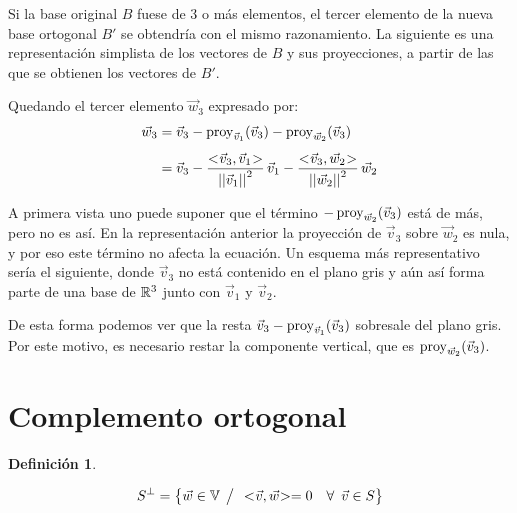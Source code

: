 \documentclass[a5paper,12pt,twoside]{book}
\newtheorem{defn}{{Definición}}[chapter]
\begin{document}
Si la base original $B$ fuese de 3 o más elementos, el tercer elemento de la nueva base ortogonal $B'$ se obtendría con el mismo razonamiento. La siguiente es una representación simplista de los vectores de $B$ y sus proyecciones, a partir de las que se obtienen los vectores de $B'$.

\begin{center}
    \def\svgwidth{0.6\linewidth}
    
\end{center}

Quedando el tercer elemento $\Vec{w}_3$ expresado por:
\begin{align*}
    \Vec{w}_3 &= \Vec{v}_3 - \operatorname{proy}_{\Vec{v}_1}(\Vec{v}_3) - \operatorname{proy}_{\Vec{w}_2}(\Vec{v}_3)
    \\[1ex]
    &= \Vec{v}_3 - \frac{<\hspace{-0.8mm}\Vec{v}_3,\Vec{v}_1\hspace{-0.8mm}>}{{\left|\left| {\Vec{v}_1} \right|\right|}^2} \, \Vec{v}_1 - \frac{<\hspace{-0.8mm}\Vec{v}_3,\Vec{w}_2\hspace{-0.8mm}>}{{\left|\left| {\Vec{w}_2} \right|\right|}^2} \, \Vec{w}_2
\end{align*}

A primera vista uno puede suponer que el término $-\operatorname{proy}_{\Vec{w}_2}(\Vec{v}_3)$ está de más, pero no es así. En la representación anterior la proyección de $\Vec{v}_3$ sobre $\Vec{w}_2$ es nula, y por eso este término no afecta la ecuación. Un esquema más representativo sería el siguiente, donde $\Vec{v}_3$ no está contenido en el plano gris y aún así forma parte de una base de $\mathbb{R}^3$ junto con $\Vec{v}_1$ y $\Vec{v}_2$.

\begin{center}
    \def\svgwidth{0.7\linewidth}
    
\end{center}

De esta forma podemos ver que la resta $\Vec{v}_3-\operatorname{proy}_{\Vec{v}_1}(\Vec{v}_3)$ sobresale del plano gris. Por este motivo, es necesario restar la componente vertical, que es $\operatorname{proy}_{\Vec{w}_2}(\Vec{v}_3)$.


\section{Complemento ortogonal}

\begin{mdframed}[style=MyFrame1]
    \begin{defn}
        \label{defn:compOrto}
    \end{defn}
    \begin{equation*}
        S^\perp = { \left\{ {\Vec{w} \in \mathbb{V} \hspace{1ex} \big/ \hspace{1ex} <\hspace{-0.8mm}\Vec{v},\Vec{w}\hspace{-0.8mm}> = 0 \quad \forall \enspace \Vec{v} \in S} \right\} }
    \end{equation*}
\end{mdframed}
\end{document}
